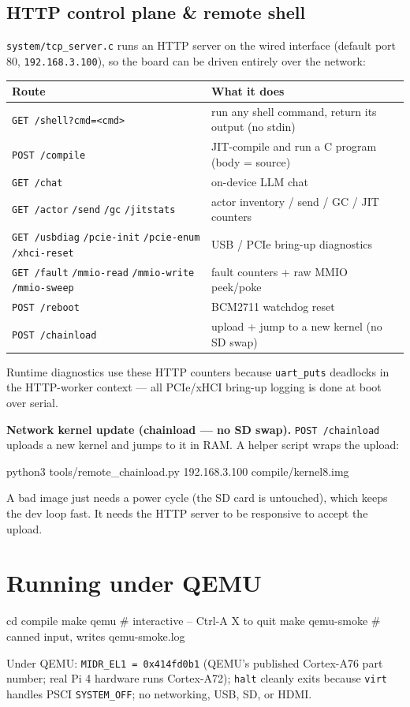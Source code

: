 \documentclass[a4paper,11pt]{article}
\begin{document}
\subsection{HTTP control plane \& remote shell}
\verb|system/tcp_server.c| runs an HTTP server on the wired interface (default
port 80, \verb|192.168.3.100|), so the board can be driven entirely over the
network:
\begin{center}\footnotesize
\begin{tabular}{@{}l p{8.4cm}@{}}
\toprule \textbf{Route} & \textbf{What it does}\\ \midrule
\verb|GET /shell?cmd=<cmd>| & run any shell command, return its output (no stdin)\\
\verb|POST /compile| & JIT-compile and run a C program (body = source)\\
\verb|GET /chat| & on-device LLM chat\\
\verb|GET /actor| \verb|/send| \verb|/gc| \verb|/jitstats| & actor inventory / send / GC / JIT counters\\
\verb|GET /usbdiag| \verb|/pcie-init| \verb|/pcie-enum| \verb|/xhci-reset| & USB / PCIe bring-up diagnostics\\
\verb|GET /fault| \verb|/mmio-read| \verb|/mmio-write| \verb|/mmio-sweep| & fault counters + raw MMIO peek/poke\\
\verb|POST /reboot| & BCM2711 watchdog reset\\
\verb|POST /chainload| & upload + jump to a new kernel (no SD swap)\\
\bottomrule
\end{tabular}
\end{center}
Runtime diagnostics use these HTTP counters because \verb|uart_puts| deadlocks in
the HTTP-worker context --- all PCIe/xHCI bring-up logging is done at boot over
serial.

\textbf{Network kernel update (chainload --- no SD swap).} \verb|POST /chainload|
uploads a new kernel and jumps to it in RAM. A helper script wraps the upload:
\begin{code}
python3 tools/remote_chainload.py 192.168.3.100 compile/kernel8.img
\end{code}
A bad image just needs a power cycle (the SD card is untouched), which keeps the
dev loop fast. It needs the HTTP server to be responsive to accept the upload.

\section{Running under QEMU}
\begin{code}
cd compile
make qemu          # interactive -- Ctrl-A X to quit
make qemu-smoke    # canned input, writes qemu-smoke.log
\end{code}
Under QEMU: \verb|MIDR_EL1 = 0x414fd0b1| (QEMU's published Cortex-A76 part
number; real Pi 4 hardware runs Cortex-A72); \verb|halt| cleanly exits because
\verb|virt| handles PSCI \verb|SYSTEM_OFF|; no networking, USB, SD, or HDMI.
\end{document}

